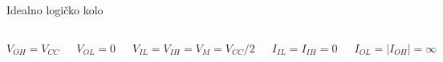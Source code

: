 \begin{frame}[label=08-s034]{Idealno logičko kolo}
\begin{columns}[c,onlytextwidth]\centering
{}
$V_{OH}=V_{CC}$\par\medskip
$V_{OL}=0$\par\medskip
$V_{IL}=V_{IH}=V_M=V_{CC}/2$\par\medskip
$I_{IL}=I_{IH}=0$\par\medskip
$I_{OL}=|I_{OH}|=\infty$
\end{columns}
\end{frame}
